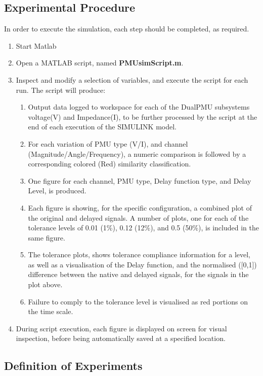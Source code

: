 \subsection{Experimental Procedure}
In order to execute the simulation, each step should be completed, as required.
\begin{enumerate}
    \item Start Matlab
    \item Open a MATLAB script, named \textbf{PMUsimScript.m}.
    \item Inspect and modify a selection of variables, and execute the script for each run. The script will produce:
    \begin{enumerate}
    \item Output data logged to workspace for each of the DualPMU subsystems voltage(V) and Impedance(I), to be further processed by the script at the end of each execution of the SIMULINK model.
    \item For each variation of PMU type (V/I), and channel (Magnitude/Angle/Frequency), a numeric comparison is followed by a corresponding colored (Red) similarity classification.
    \item One figure for each channel,  PMU type,  Delay function type, and Delay Level, is produced.
    \item Each figure is showing, for the specific configuration, a combined plot of the original and delayed signals. A number of plots, one for each of the tolerance levels of 0.01 (1\%), 0.12 (12\%), and 0.5 (50\%), is included in the same figure.
    \item The tolerance plots, shows  tolerance compliance information for a level, as well as a visualisation of the Delay function, and the normalised ([0,1]) difference between the native and delayed signals, for the signals in the plot above.
    \item Failure to comply to the tolerance level is visualised as red portions on the time scale.
    \end{enumerate}
    \item During script execution, each figure is displayed on screen for visual inspection, before being automatically saved at a specified location. 
\end{enumerate}
\subsection{Definition of Experiments} \label{sec:ExpDef}

